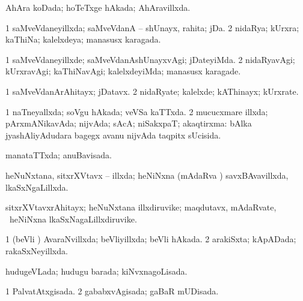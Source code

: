 {\bentry
{} 
\gl{\gu}
\bmng
 AhAra koDada; hoTeTxge hAkada; AhAravillxda. 
\emng
\eentry

\bentry
{} 
\gl{\gu}
\expl{}
\bmng
\bnum
\num{1} saMveVdaneyillxda; saMveVdanA -- shUnayx, rahita; jDa. 
\num{2} nidaRya; kUrxra; kaThiNa; kalelxdeya; manasusx karagada. 
\enum
\emng
\eentry

\bentry
{} 
\gl{\kirxvi}
\expl{}
\bmng
\bnum
\num{1} saMveVdaneyillxde; saMveVdanAshUnayxvAgi; jDateyiMda. 
\num{2} nidaRyavAgi; kUrxravAgi; kaThiNavAgi; kalelxdeyiMda; manasusx karagade. 
\enum
\emng
\eentry

\bentry
{} 
\gl{\nA}
\expl{}
\bmng
\bnum
\num{1} saMveVdanArAhitayx; jDatavx. 
\num{2} nidaRyate; kalelxde; kAThinayx; kUrxrate. 
\enum
\emng
\eentry

\bentry
{} 
\gl{\gu}
\expl{}
\bmng
\bnum
\num{1} naTneyallxda; soVgu hAkada; veVSa kaTTxda. 
\num{2} mucucxmare illxda; pArxmANikavAda; nijvAda; sAcA; niSakxpaT; akaqtirxma:  bAlka jyashAliyAdudara bagegx avanu nijvAda taqpitx sUcisida. 
\enum
\emng
\eentry

\bentry
{} 
\gl{\gu}
\expl{}
\bmng
 manataTTxda; anuBavisada. 
\emng
\eentry

\bentry
{} 
\gl{\gu}
\expl{}
\bmng
 heNuNxtana, sitxrXVtavx -- illxda; heNiNxna (mAdaRva \mo) savxBAvavillxda, lkaSxNgaLillxda. 
\emng
\eentry

\bentry
{} 
\gl{\nA}
\expl{}
\bmng
 sitxrXVtavxrAhitayx; heNuNxtana illxdiruvike; maqdutavx, mAdaRvate, \mo\ heNiNxna lkaSxNagaLillxdiruvike. 
\emng
\eentry

\bentry
{} 
\gl{\gu}
\expl{}
\bmng
\bnum
\num{1} (beVli \mo) AvaraNvillxda; beVliyillxda; beVli hAkada. 
\num{2} arakiSxta; kApADada; rakaSxNeyillxda. 
\enum
\emng
\eentry

\bentry
{} 
\gl{\gu}
\expl{}
\bmng
 hudugeVLada; hudugu barada; kiNvxnagoLisada. 
\emng
\eentry

\bentry
{} 
\gl{\gu}
\expl{}
\bmng
\emng
\eentry

\bentry
{} 
\gl{\gu}
\expl{}
\bmng
\bnum
\num{1} PalvatAtxgisada. 
\num{2} gababxvAgisada; gaBaR mUDisada. 
\enum
\emng
\eentry

}
